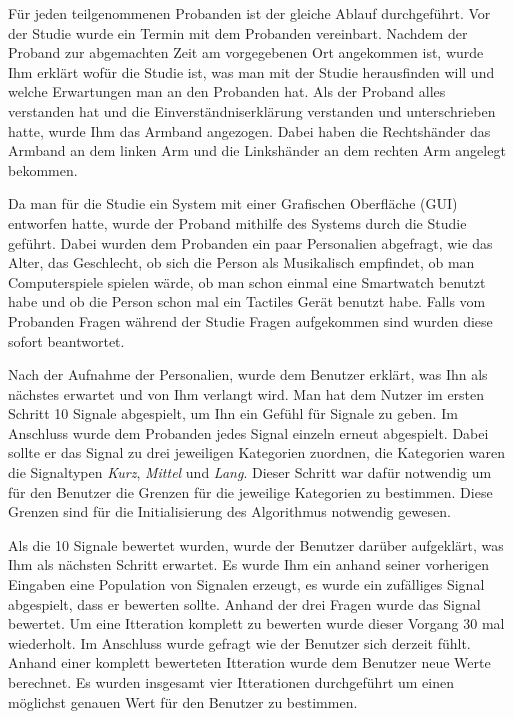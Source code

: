 F{\"u}r jeden teilgenommenen Probanden ist der gleiche Ablauf durchgef{\"u}hrt. 
Vor der Studie wurde ein Termin mit dem Probanden vereinbart. 
Nachdem der Proband zur abgemachten Zeit am vorgegebenen Ort angekommen ist, wurde Ihm erkl{\"a}rt wof{\"u}r die Studie ist, was man mit der Studie herausfinden will und welche Erwartungen man an den Probanden hat. 
Als der Proband alles verstanden hat und die Einverst{\"a}ndniserkl{\"a}rung verstanden und unterschrieben hatte, wurde Ihm das Armband angezogen. Dabei haben die Rechtsh{\"a}nder das Armband an dem linken Arm und die Linksh{\"a}nder an dem rechten Arm angelegt bekommen.

Da man f{\"u}r die Studie ein System mit einer Grafischen Oberfl{\"a}che (GUI) entworfen hatte, wurde der Proband mithilfe des Systems durch die Studie gef{\"u}hrt.
Dabei wurden dem Probanden ein paar Personalien abgefragt, wie das Alter, das Geschlecht, ob sich die Person als Musikalisch empfindet, ob man Computerspiele spielen w{\"a}rde, ob man schon einmal eine Smartwatch benutzt habe und ob die Person schon mal ein Tactiles Ger{\"a}t benutzt habe. 
Falls vom Probanden Fragen w{\"a}hrend der Studie Fragen aufgekommen sind wurden diese sofort beantwortet. 

Nach der Aufnahme der Personalien, wurde dem Benutzer erkl{\"a}rt, was Ihn als n{\"a}chstes erwartet und von Ihm verlangt wird. 
Man hat dem Nutzer im ersten Schritt 10 Signale abgespielt, um Ihn ein Gef{\"u}hl f{\"u}r Signale zu geben. 
Im Anschluss wurde dem Probanden jedes Signal einzeln erneut abgespielt. 
Dabei sollte er das Signal zu drei jeweiligen Kategorien zuordnen, die Kategorien waren die Signaltypen \textit{Kurz}, \textit{Mittel} und \textit{Lang}. 
Dieser Schritt war daf{\"u}r notwendig um f{\"u}r den Benutzer die Grenzen f{\"u}r die jeweilige Kategorien zu bestimmen. 
Diese Grenzen sind f{\"u}r die Initialisierung des Algorithmus notwendig gewesen. 

Als die 10 Signale bewertet wurden, wurde der Benutzer dar{\"u}ber aufgekl{\"a}rt, was Ihm als n{\"a}chsten Schritt erwartet. 
Es wurde Ihm ein anhand seiner vorherigen Eingaben eine Population von Signalen erzeugt, es wurde ein zuf{\"a}lliges Signal abgespielt, dass er bewerten sollte.
Anhand der drei Fragen wurde das Signal bewertet. 
Um eine Itteration komplett zu bewerten wurde dieser Vorgang 30 mal wiederholt. 
Im Anschluss wurde gefragt wie der Benutzer sich derzeit f{\"u}hlt. 
Anhand einer komplett bewerteten Itteration wurde dem Benutzer neue Werte berechnet. 
Es wurden insgesamt vier Itterationen durchgef{\"u}hrt um einen m{\"o}glichst genauen Wert f{\"u}r den Benutzer zu bestimmen.

